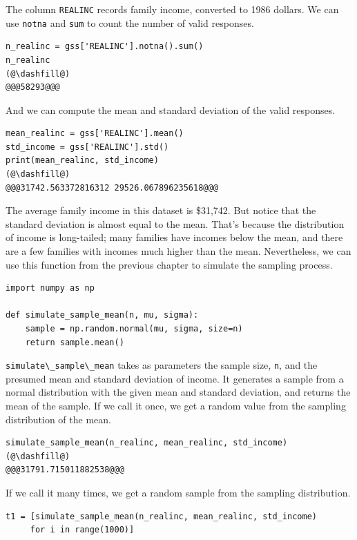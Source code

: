 The column \passthrough{\lstinline!REALINC!} records family income,
converted to 1986 dollars. We can use \passthrough{\lstinline!notna!}
and \passthrough{\lstinline!sum!} to count the number of valid
responses.

\begin{lstlisting}[]
n_realinc = gss['REALINC'].notna().sum()
n_realinc
(@\dashfill@)
@@@58293@@@
\end{lstlisting}

And we can compute the mean and standard deviation of the valid
responses.

\begin{lstlisting}[]
mean_realinc = gss['REALINC'].mean()
std_income = gss['REALINC'].std()
print(mean_realinc, std_income)
(@\dashfill@)
@@@31742.563372816312 29526.067896235618@@@
\end{lstlisting}

The average family income in this dataset is \$31,742. But notice that
the standard deviation is almost equal to the mean. That's because the
distribution of income is long-tailed; many families have incomes below
the mean, and there are a few families with incomes much higher than the
mean. Nevertheless, we can use this function from the previous chapter
to simulate the sampling process.

\begin{lstlisting}[]
import numpy as np

def simulate_sample_mean(n, mu, sigma):
    sample = np.random.normal(mu, sigma, size=n)
    return sample.mean()
\end{lstlisting}

\passthrough{\lstinline!simulate\_sample\_mean!} takes as parameters the
sample size, \passthrough{\lstinline!n!}, and the presumed mean and
standard deviation of income. It generates a sample from a normal
distribution with the given mean and standard deviation, and returns the
mean of the sample. If we call it once, we get a random value from the
sampling distribution of the mean.

\begin{lstlisting}[]
simulate_sample_mean(n_realinc, mean_realinc, std_income)
(@\dashfill@)
@@@31791.715011882538@@@
\end{lstlisting}

If we call it many times, we get a random sample from the sampling
distribution.

\begin{lstlisting}[]
t1 = [simulate_sample_mean(n_realinc, mean_realinc, std_income)
     for i in range(1000)]
\end{lstlisting}

